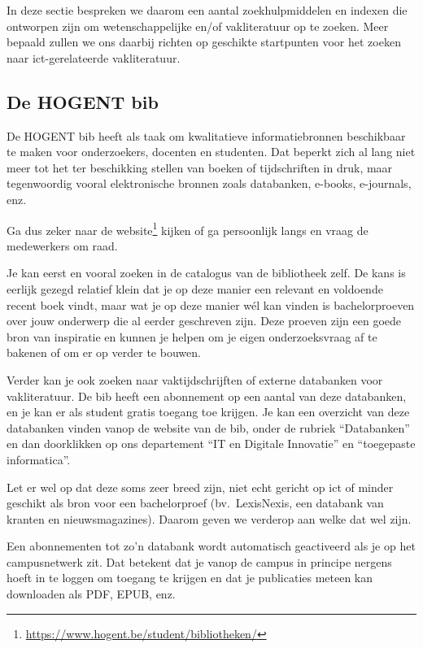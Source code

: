 In deze sectie bespreken we daarom een aantal zoekhulpmiddelen en indexen die ontworpen zijn om wetenschappelijke en/of vakliteratuur op te zoeken. Meer bepaald zullen we ons daarbij richten op geschikte startpunten voor het zoeken naar ict-gerelateerde vakliteratuur.

\subsection{De HOGENT bib}%
\label{ssec:hogent-bib}

De HOGENT bib heeft als taak om kwalitatieve informatiebronnen beschikbaar te maken voor onderzoekers, docenten en studenten. Dat beperkt zich al lang niet meer tot het ter beschikking stellen van boeken of tijdschriften in druk, maar tegenwoordig vooral elektronische bronnen zoals databanken, e-books, e-journals, enz.

Ga dus zeker naar de website\footnote{\url{https://www.hogent.be/student/bibliotheken/}} kijken of ga persoonlijk langs en vraag de medewerkers om raad.

Je kan eerst en vooral zoeken in de catalogus van de bibliotheek zelf. De kans is eerlijk gezegd relatief klein dat je op deze manier een relevant en voldoende recent boek vindt, maar wat je op deze manier wél kan vinden is bachelorproeven over jouw onderwerp die al eerder geschreven zijn. Deze proeven zijn een goede bron van inspiratie en kunnen je helpen om je eigen onderzoeksvraag af te bakenen of om er op verder te bouwen.

Verder kan je ook zoeken naar vaktijdschrijften of externe databanken voor vakliteratuur. De bib heeft een abonnement op een aantal van deze databanken, en je kan er als student gratis toegang toe krijgen. Je kan een overzicht van deze databanken vinden vanop de website van de bib, onder de rubriek ``Databanken'' en dan doorklikken op ons departement ``IT en Digitale Innovatie'' en ``toegepaste informatica''.

Let er wel op dat deze soms zeer breed zijn, niet echt gericht op ict of minder geschikt als bron voor een bachelorproef (bv.\ LexisNexis, een databank van kranten en nieuwsmagazines). Daarom geven we verderop aan welke dat wel zijn.

Een abonnementen tot zo'n databank wordt automatisch geactiveerd als je op het campusnetwerk zit. Dat betekent dat je vanop de campus in principe nergens hoeft in te loggen om toegang te krijgen en dat je publicaties meteen kan downloaden als PDF, EPUB, enz.

